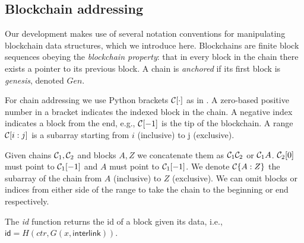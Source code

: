 \subsection{Blockchain addressing}
Our development makes use of several notation conventions for manipulating
blockchain data structures, which we introduce here. Blockchains are finite
block sequences obeying the \textit{blockchain property}: that in every block in
the chain there exists a pointer to its previous block. A chain is
\textit{anchored} if its first block is \textit{genesis}, denoted $Gen$.

For chain addressing we use Python brackets $\mathcal{C}[\cdot]$ as in
\cite{fruitchains}. A zero-based positive number in a bracket indicates the
indexed block in the chain. A negative index indicates a block from the end,
e.g., $\mathcal{C}[-1]$ is the tip of the blockchain. A range $\mathcal{C}[i:j]$ is a
subarray starting from $i$ (inclusive) to j (exclusive).

Given chains $\mathcal{C}_1, \mathcal{C}_2$ and blocks $A, Z$ we concatenate them as
$\mathcal{C}_1 \mathcal{C}_2$ or $\mathcal{C}_1 A$. $\mathcal{C}_2[0]$ must point to $\mathcal{C}_1[-1]$
and $A$ must point to $\mathcal{C}_1[-1]$. We denote $\mathcal{C}\{A:Z\}$ the subarray of
the chain from $A$ (inclusive) to $Z$ (exclusive). We can omit blocks or indices
from either side of the range to take the chain to the beginning or end
respectively.

The \textit{id} function
returns the id of a block given its data, i.e., $\textsf{id} = H(ctr, G(x,
\textsf{interlink}))$.
